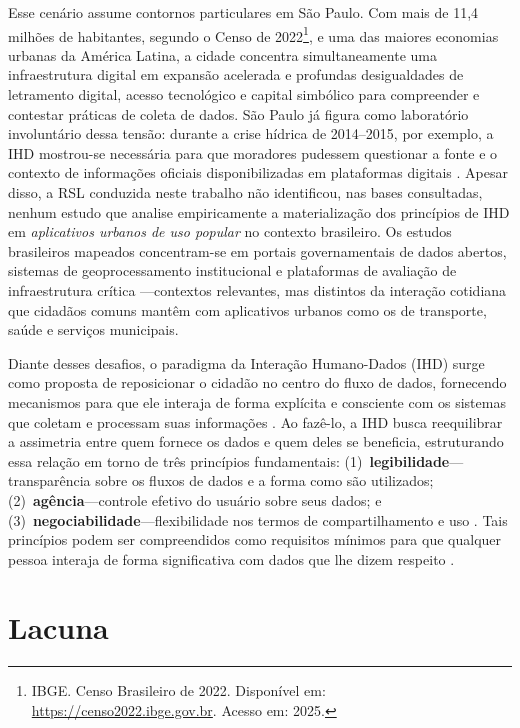 \documentclass[
	12pt,				%
	oneside,			%
	a4paper,			%
	english,			%
	brazil				%
	]{abntex2ppgsi}
\begin{document}
    Esse cenário assume contornos particulares em São Paulo. Com mais de 11,4 milhões de habitantes, segundo o Censo de 2022\footnote{IBGE. Censo Brasileiro de 2022. Disponível em: \url{https://censo2022.ibge.gov.br}. Acesso em: 2025.}, e uma das maiores economias urbanas da América Latina, a cidade concentra simultaneamente uma infraestrutura digital em expansão acelerada e profundas desigualdades de letramento digital, acesso tecnológico e capital simbólico para compreender e contestar práticas de coleta de dados. São Paulo já figura como laboratório involuntário dessa tensão: durante a crise hídrica de 2014--2015, por exemplo, a IHD mostrou-se necessária para que moradores pudessem questionar a fonte e o contexto de informações oficiais disponibilizadas em plataformas digitais \cite{Hornung2015}. Apesar disso, a RSL conduzida neste trabalho não identificou, nas bases consultadas, nenhum estudo que analise empiricamente a materialização dos princípios de IHD em \emph{aplicativos urbanos de uso popular} no contexto brasileiro. Os estudos brasileiros mapeados concentram-se em portais governamentais de dados abertos, sistemas de geoprocessamento institucional e plataformas de avaliação de infraestrutura crítica \cite{VICTORELLI2020Understanding, Strey2019Human, Victorelli2024Adopting, barcellos2022towards, Belizario2023Interacao}---contextos relevantes, mas distintos da interação cotidiana que cidadãos comuns mantêm com aplicativos urbanos como os de transporte, saúde e serviços municipais.
   
    Diante desses desafios, o paradigma da Interação Humano-Dados (IHD) surge como proposta de reposicionar o cidadão no centro do fluxo de dados, fornecendo mecanismos para que ele interaja de forma explícita e consciente com os sistemas que coletam e processam suas informações \cite{mortier2015humandatainteractionhumanface}. Ao fazê-lo, a IHD busca reequilibrar a assimetria entre quem fornece os dados e quem deles se beneficia, estruturando essa relação em torno de três princípios fundamentais: (1)~\textbf{legibilidade}---transparência sobre os fluxos de dados e a forma como são utilizados; (2)~\textbf{agência}---controle efetivo do usuário sobre seus dados; e (3)~\textbf{negociabilidade}---flexibilidade nos termos de compartilhamento e uso \cite{mortier2015humandatainteractionhumanface}. Tais princípios podem ser compreendidos como requisitos mínimos para que qualquer pessoa interaja de forma significativa com dados que lhe dizem respeito \cite{Hornung2015}.
   

  \section{Lacuna}
\end{document}
